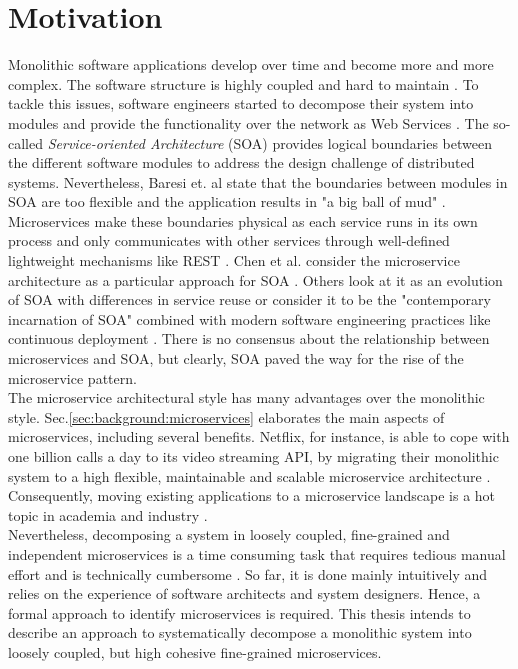 \section{Motivation}
\label{sec:Introduction:Motivation}
Monolithic software applications develop over time and become more and more complex. The software structure is highly coupled and hard to maintain \cite{MigratingTowardsSurvey}. To tackle this issues, software engineers started to decompose their system into modules and provide the functionality over the network as Web Services \cite{ServiceCutter}. The so-called \textit{Service-oriented Architecture} (SOA) provides logical boundaries between the different software modules to address the design challenge of distributed systems. Nevertheless, Baresi et. al state that the boundaries between modules in SOA are too flexible and the application results in "a big ball of mud" \cite{interfaceAnalysisBaresi}. Microservices make these boundaries physical as each service runs in its own process and only communicates with other services through well-defined lightweight mechanisms like REST \cite{FunctionalDecompositionHeinrich}. Chen et al. consider the microservice architecture as a particular approach for SOA \cite{DataflowDrivenChen}. Others look at it as an evolution of SOA with differences in service reuse \cite{interfaceAnalysisBaresi} or consider it to be the "contemporary incarnation of SOA" combined with modern software engineering practices like continuous deployment \cite{ServiceCutter}. There is no consensus about the relationship between microservices and SOA, but clearly, SOA paved the way for the rise of the microservice pattern.\\
The microservice architectural style has many advantages over the monolithic style. Sec.\ref{sec:background:microservices} elaborates the main aspects of microservices, including several benefits. Netflix, for instance, is able to cope with one billion calls a day to its video streaming API, by migrating their monolithic system to a high flexible, maintainable and scalable microservice architecture \cite{DataflowDrivenChen}. Consequently, moving existing applications to a microservice landscape is a hot topic in academia and industry \cite{ObjectAwareAmiri}. \\
Nevertheless, decomposing a system in loosely coupled, fine-grained and independent microservices is a time consuming task that requires tedious manual effort \cite{ServiceCutter} and is technically cumbersome \cite{HeuristicsAlwis}. So far, it is done mainly intuitively and relies on the experience of software architects and system designers. Hence, a formal approach to identify microservices is required. This thesis intends to describe an approach to systematically decompose a monolithic system into loosely coupled, but high cohesive fine-grained microservices. 



